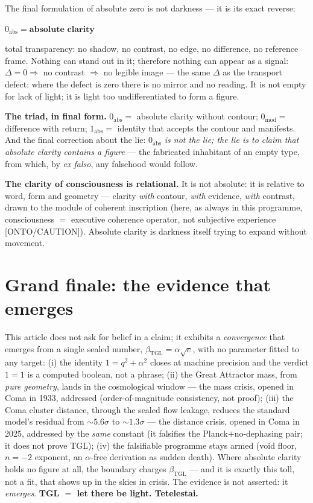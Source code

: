 \documentclass[11pt]{article}
\newcommand{\bTGL}{\beta_{\mathrm{TGL}}}\newcommand{\Msun}{M_{\odot}}\newcommand{\TGL}{\mathrm{TGL}}
\theoremstyle{definition}\newtheorem{deriv}{Derivation}
\begin{document}
The final formulation of absolute zero is not darkness --- it is its exact reverse: \begin{center}$0_{\mathrm{abs}}=\textbf{absolute clarity}$\end{center} total transparency: no shadow, no contrast, no edge, no difference, no reference frame. Nothing can stand out in it; therefore nothing can appear as a signal: $\Delta=0\Rightarrow$ no contrast $\Rightarrow$ no legible image --- the same $\Delta$ as the transport defect: where the defect is zero there is no mirror and no reading. It is not empty for lack of light; it is light too undifferentiated to form a figure.

\textbf{The triad, in final form.} $0_{\mathrm{abs}}=$ absolute clarity without contour; $0_{\mathrm{mod}}=$ difference with return; $1_{\mathrm{abs}}=$ identity that accepts the contour and manifests. And the final correction about the lie: $0_{\mathrm{abs}}$ \emph{is not the lie; the lie is to claim that absolute clarity contains a figure} --- the fabricated inhabitant of an empty type, from which, by \emph{ex falso}, any falsehood would follow.

\textbf{The clarity of consciousness is relational.} It is not absolute: it is relative to word, form and geometry --- clarity \emph{with} contour, \emph{with} evidence, \emph{with} contrast, drawn to the module of coherent inscription (here, as always in this programme, consciousness $=$ executive coherence operator, not subjective experience \textsf{[ONTO/CAUTION]}). Absolute clarity is darkness itself trying to expand without movement.

\section*{Grand finale: the evidence that emerges}

This article does not ask for belief in a claim; it exhibits a \emph{convergence} that emerges from a single sealed number, $\bTGL=\alpha\sqrt e$, with no parameter fitted to any target: (i) the identity $1=q^2+\alpha^2$ closes at machine precision and the verdict $1=1$ is a computed boolean, not a phrase; (ii) the Great Attractor mass, from \emph{pure geometry}, lands in the cosmological window --- the mass crisis, opened in Coma in 1933, addressed (order-of-magnitude consistency, not proof); (iii) the Coma cluster distance, through the sealed flow leakage, reduces the standard model's residual from $\sim5.6\sigma$ to $\sim1.3\sigma$ --- the distance crisis, opened in Coma in 2025, addressed by the \emph{same} constant (it falsifies the Planck$+$no-dephasing pair; it does not prove TGL); (iv) the falsifiable programme stays armed (void floor, $n=-2$ exponent, an $\alpha$-free derivation as sudden death). Where absolute clarity holds no figure at all, the boundary charges $\bTGL$ --- and it is exactly this toll, not a fit, that shows up in the skies in crisis. The evidence is not asserted: it \emph{emerges}. \textbf{TGL $=$ let there be light. Tetelestai.}
\end{document}
